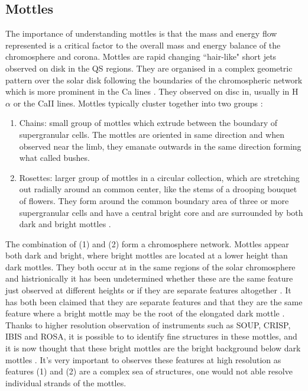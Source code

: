 \documentclass[12pt]{ociamthesis}
\begin{document}
\subsection{Mottles}
\label{subsec:mots}
The importance of understanding mottles is that the mass and energy flow represented is a critical factor to the overall mass and energy balance of the chromosphere and corona. Mottles are rapid changing ``hair-like" short jets observed on disk in the QS regions. They are organised in a complex geometric pattern over the solar disk following the boundaries of the chromospheric network which is more prominent in the Ca lines \citep{Tsiropoula2012}. They observed on disc in, usually in H$\alpha$ or the CaII lines. Mottles typically cluster together into two groups \citep{Beckers1963ApJ138648B}:
\begin{enumerate}
\item Chains: small group of mottles which extrude between the boundary of supergranular cells. The mottles are oriented in same direction and when observed near the limb, they emanate outwards in the same direction forming what \cite{Cragg1963ApJ138303C} called bushes. 
\item Rosettes: larger group of mottles in a circular collection, which are stretching out radially around an common center, like the stems of a drooping bouquet of flowers. They form around the common boundary area of three or more supergranular cells and have a central bright core and are surrounded by both dark and bright mottles \cite{Tsiropoula2012}.    
\end{enumerate} 
The combination of (1) and (2) form a chromosphere network. Mottles appear both dark and bright, where bright mottles are located at a lower height than dark mottles. They both occur at in the same regions of the solar chromosphere and histrionically it has been undetermined whether these are the same feature just observed at different heights or if they are separate features altogether  \citep{Tsiropoula2012, Tsiropoula1993A}. It has both been claimed that they are separate features \cite{Alissandrakis1971SoPh2047A} and that they are the same feature where a bright mottle may be the root of the elongated dark mottle \citep{Banos1970SoPh12106B}. Thanks to higher resolution observation of instruments such as SOUP, CRISP, IBIS and ROSA, it is possible to to identify fine structures in these mottles, and it is now thought that these bright mottles are the bright background below dark mottles \citep{Tsiropoula2012}. It's very important to observes these features at high resolution as features (1) and (2) are a complex sea of structures, one would not able resolve individual strands of the mottles. \\
\end{document}
